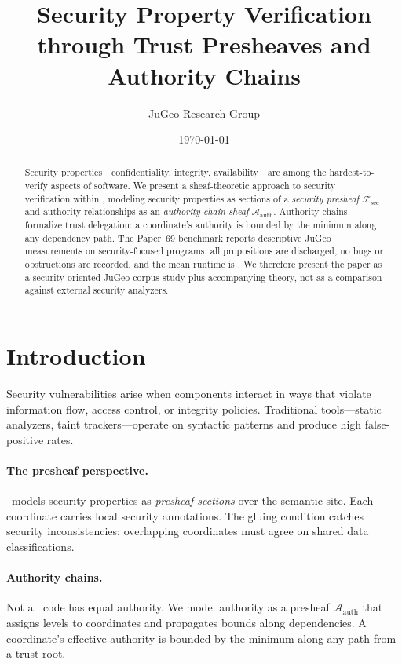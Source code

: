\documentclass[11pt]{article}
\title{\textbf{Security Property Verification\\
through Trust Presheaves and Authority Chains}}
\author{JuGeo Research Group}
\date{\today}
\newcommand{\SecSheaf}{\mathcal{F}_{\mathrm{sec}}}
\newcommand{\AuthSheaf}{\mathcal{A}_{\mathrm{auth}}}
\begin{document}
\maketitle

\begin{abstract}
Security properties---confidentiality, integrity, availability---are
among the hardest-to-verify aspects of software.  We present a
sheaf-theoretic approach to security verification within \JuGeo,
modeling security properties as sections of a \emph{security presheaf}
$\SecSheaf$ and authority relationships as an \emph{authority chain
sheaf} $\AuthSheaf$. Authority chains formalize trust delegation: a
coordinate's authority is bounded by the minimum along any dependency
path. The Paper~69 benchmark reports descriptive JuGeo measurements on
\ppLXIXprogramCount{} security-focused programs: all
\ppLXIXpropsTotal{} propositions are discharged, no bugs or obstructions are
recorded, and the mean runtime is \ppLXIXtimeMean{}. We therefore present the
paper as a security-oriented JuGeo corpus study plus accompanying theory, not
as a comparison against external security analyzers.
\end{abstract}

\newpage

\section{Introduction}\label{sec:intro}

Security vulnerabilities arise when components interact in ways that
violate information flow, access control, or integrity policies.
Traditional tools---static analyzers, taint trackers---operate on
syntactic patterns and produce high false-positive rates.

\paragraph{The presheaf perspective.}
\JuGeo\ models security properties as \emph{presheaf sections} over
the semantic site.  Each coordinate carries local security
annotations.  The gluing condition catches security inconsistencies:
overlapping coordinates must agree on shared data classifications.

\paragraph{Authority chains.}
Not all code has equal authority.  We model authority as a presheaf
$\AuthSheaf$ that assigns levels to coordinates and propagates bounds
along dependencies.  A coordinate's effective authority is bounded by
the minimum along any path from a trust root.
\end{document}
